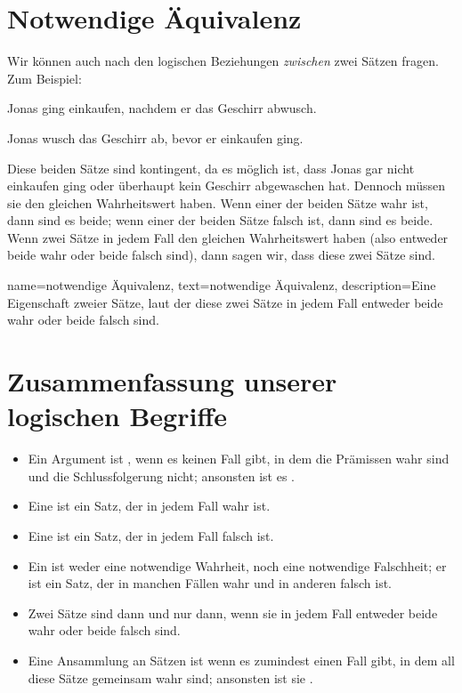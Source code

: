 \section{Notwendige Äquivalenz}

Wir können auch nach den logischen Beziehungen \emph{zwischen} zwei Sätzen fragen. Zum Beispiel:
\begin{earg}
\item[] Jonas ging einkaufen, nachdem er das Geschirr abwusch.
\item[] Jonas wusch das Geschirr ab, bevor er einkaufen ging.
\end{earg}
Diese beiden Sätze sind kontingent, da es möglich ist, dass Jonas gar nicht einkaufen ging oder überhaupt kein Geschirr abgewaschen hat. Dennoch müssen sie den gleichen Wahrheitswert haben. Wenn einer der beiden Sätze wahr ist, dann sind es beide; wenn einer der beiden Sätze falsch ist, dann sind es beide. Wenn zwei Sätze in jedem Fall den gleichen Wahrheitswert haben (also entweder beide wahr oder beide falsch sind), dann sagen wir, dass diese zwei Sätze  sind.

{
name={notwendige Äquivalenz},
text={notwendige Äquivalenz},
description={Eine Eigenschaft zweier Sätze, laut der diese zwei Sätze in jedem Fall entweder beide wahr oder beide falsch sind.}
}


\section*{Zusammenfassung unserer logischen Begriffe}

\begin{itemize}
\item Ein Argument ist , wenn es keinen Fall gibt, in dem die Prämissen wahr sind und die Schlussfolgerung nicht; ansonsten ist es .

\item Eine  ist ein Satz, der in jedem Fall wahr ist.

\item Eine  ist ein Satz, der in jedem Fall falsch ist.

\item Ein  ist weder eine notwendige Wahrheit, noch eine notwendige Falschheit; er ist ein Satz, der in manchen Fällen wahr und in anderen falsch ist.

\item Zwei Sätze sind  dann und nur dann, wenn sie in jedem Fall entweder beide wahr oder beide falsch sind.

\item Eine Ansammlung an Sätzen ist  wenn es zumindest einen Fall gibt, in dem all diese Sätze gemeinsam wahr sind; ansonsten ist sie .
\end{itemize}


